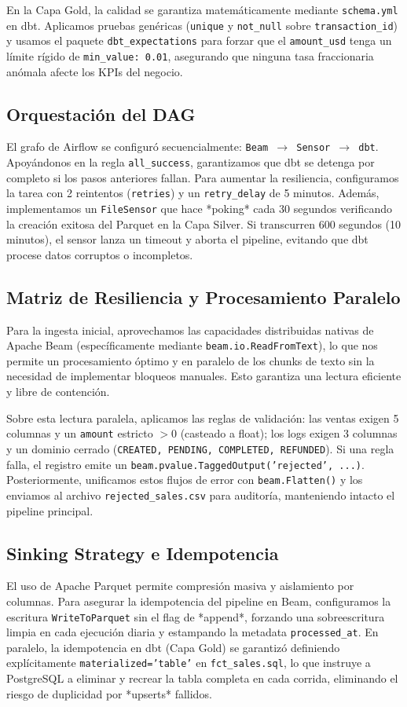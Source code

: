 \documentclass[11pt,a4paper]{article}
\begin{document}
En la Capa Gold, la calidad se garantiza matemáticamente mediante \texttt{schema.yml} en dbt. Aplicamos pruebas genéricas (\texttt{unique} y \texttt{not\_null} sobre \texttt{transaction\_id}) y usamos el paquete \texttt{dbt\_expectations} para forzar que el \texttt{amount\_usd} tenga un límite rígido de \texttt{min\_value: 0.01}, asegurando que ninguna tasa fraccionaria anómala afecte los KPIs del negocio.

\subsection{Orquestación del DAG}
El grafo de Airflow se configuró secuencialmente: \texttt{Beam $\rightarrow$ Sensor $\rightarrow$ dbt}. Apoyándonos en la regla \texttt{all\_success}, garantizamos que dbt se detenga por completo si los pasos anteriores fallan. 
Para aumentar la resiliencia, configuramos la tarea con 2 reintentos (\texttt{retries}) y un \texttt{retry\_delay} de 5 minutos. Además, implementamos un \texttt{FileSensor} que hace *poking* cada 30 segundos verificando la creación exitosa del Parquet en la Capa Silver. Si transcurren 600 segundos (10 minutos), el sensor lanza un timeout y aborta el pipeline, evitando que dbt procese datos corruptos o incompletos.

\subsection{Matriz de Resiliencia y Procesamiento Paralelo}
Para la ingesta inicial, aprovechamos las capacidades distribuidas nativas de Apache Beam (específicamente mediante \texttt{beam.io.ReadFromText}), lo que nos permite un procesamiento óptimo y en paralelo de los chunks de texto sin la necesidad de implementar bloqueos manuales. Esto garantiza una lectura eficiente y libre de contención.

Sobre esta lectura paralela, aplicamos las reglas de validación: las ventas exigen 5 columnas y un \texttt{amount} estricto $>0$ (casteado a float); los logs exigen 3 columnas y un dominio cerrado (\texttt{CREATED, PENDING, COMPLETED, REFUNDED}). Si una regla falla, el registro emite un \texttt{beam.pvalue.TaggedOutput('rejected', ...)}. Posteriormente, unificamos estos flujos de error con \texttt{beam.Flatten()} y los enviamos al archivo \texttt{rejected\_sales.csv} para auditoría, manteniendo intacto el pipeline principal.

\subsection{Sinking Strategy e Idempotencia}
El uso de Apache Parquet permite compresión masiva y aislamiento por columnas. Para asegurar la idempotencia del pipeline en Beam, configuramos la escritura \texttt{WriteToParquet} sin el flag de *append*, forzando una sobreescritura limpia en cada ejecución diaria y estampando la metadata \texttt{processed\_at}. 
En paralelo, la idempotencia en dbt (Capa Gold) se garantizó definiendo explícitamente \texttt{materialized='table'} en \texttt{fct\_sales.sql}, lo que instruye a PostgreSQL a eliminar y recrear la tabla completa en cada corrida, eliminando el riesgo de duplicidad por *upserts* fallidos.
\end{document}
